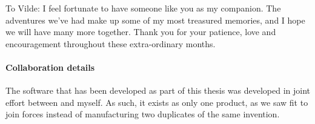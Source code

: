 To Vilde: I feel fortunate to have someone like you as my companion. The adventures we've had make up
some of my most treasured memories, and I hope we will have many more together. Thank you for your 
patience, love and encouragement throughout these extra-ordinary months.

\paragraph{Collaboration details}

The software that has been developed as part of this thesis was developed in joint 
effort between \citeauthor{islandwind2019}\cite{islandwind2019} and myself. As such,
it exists as only one product, as we saw fit to join forces instead of manufacturing two 
duplicates of the same invention.